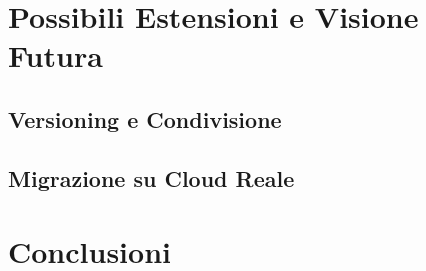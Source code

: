 \documentclass[12pt,a4paper]{report}
\begin{document}
\chapter{Possibili Estensioni e Visione Futura}
\label{cap:estensioni}

\section{Versioning e Condivisione}

\section{Migrazione su Cloud Reale}

\chapter*{Conclusioni}


% 
\end{document}
